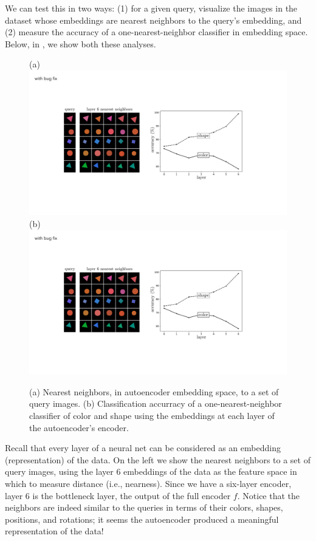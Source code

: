 We can test this in two ways: (1) for a given query, visualize the images in the dataset whose embeddings are nearest neighbors to the query's embedding, and (2) measure the accuracy of a one-nearest-neighbor classifier in embedding space. Below, in \fig{\ref{fig:representation_learning:AE_results_shapes_dataset}}, we show both these analyses.
\begin{figure}[h!]
    \centerline{
        (a) \includegraphics[width=0.38\linewidth]{figures/representation_learning/AE_NN_viz.pdf}
        (b) \includegraphics[width=0.40\linewidth]{figures/representation_learning/AE_NN_probe.pdf}
  }
  \caption{(a) Nearest neighbors, in autoencoder embedding space, to a set of query images. (b) Classification accurracy of a one-nearest-neighbor classifier of color and shape using the embeddings at each layer of the autoencoder's encoder.}
  \label{fig:representation_learning:AE_results_shapes_dataset}
\end{figure}

Recall that every layer of a neural net can be considered as an embedding (representation) of the data. On the left we show the nearest neighbors to a set of query images, using the layer 6 embeddings of the data as the feature space in which to measure distance (i.e., nearness). Since we have a six-layer encoder, layer 6 is the bottleneck layer, the output of the full encoder $f$. Notice that the neighbors are indeed similar to the queries in terms of their colors, shapes, positions, and rotations; it seems the autoencoder produced a meaningful representation of the data!

